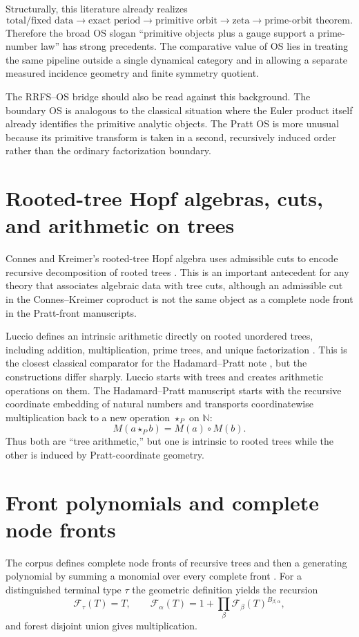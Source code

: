 \documentclass[11pt]{article}
\newcommand{\NN}{\mathbb N}
\newcommand{\cF}{\mathcal F}
\begin{document}
Structurally, this literature already realizes
\[
 \text{total/fixed data}\to\text{exact period}\to\text{primitive orbit}\to
 \text{zeta}\to\text{prime-orbit theorem}.
\]
Therefore the broad OS slogan ``primitive objects plus a gauge support a prime-number law'' has strong precedents. The comparative value of OS lies in treating the same pipeline outside a single dynamical category and in allowing a separate measured incidence geometry and finite symmetry quotient.

The RRFS--OS bridge should also be read against this background. The boundary OS is analogous to the classical situation where the Euler product itself already identifies the primitive analytic objects. The Pratt OS is more unusual because its primitive transform is taken in a second, recursively induced order rather than the ordinary factorization boundary.

\section{Rooted-tree Hopf algebras, cuts, and arithmetic on trees}
Connes and Kreimer's rooted-tree Hopf algebra uses admissible cuts to encode recursive decomposition of rooted trees \cite{ConnesKreimer1998}. This is an important antecedent for any theory that associates algebraic data with tree cuts, although an admissible cut in the Connes--Kreimer coproduct is not the same object as a complete node front in the Pratt-front manuscripts.

Luccio defines an intrinsic arithmetic directly on rooted unordered trees, including addition, multiplication, prime trees, and unique factorization \cite{Luccio2016}. This is the closest classical comparator for the Hadamard--Pratt note \cite{LekaHadamard}, but the constructions differ sharply. Luccio starts with trees and creates arithmetic operations on them. The Hadamard--Pratt manuscript starts with the recursive coordinate embedding of natural numbers and transports coordinatewise multiplication back to a new operation $\star_P$ on $\NN$:
\[
 M(a\star_P b)=M(a)\circ M(b).
\]
Thus both are ``tree arithmetic,'' but one is intrinsic to rooted trees while the other is induced by Pratt-coordinate geometry.

\section{Front polynomials and complete node fronts}
The corpus defines complete node fronts of recursive trees and then a generating polynomial by summing a monomial over every complete front \cite{LekaFront,LekaFrontProb}. For a distinguished terminal type $\tau$ the geometric definition yields the recursion
\[
 \cF_\tau(T)=T,\qquad
 \cF_\alpha(T)=1+\prod_\beta\cF_\beta(T)^{B_{\beta,\alpha}},
\]
and forest disjoint union gives multiplication.
\end{document}
